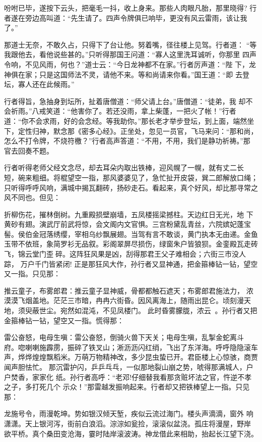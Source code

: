 吩咐已毕，遂按下云头，把毫毛一抖，收上身来。那些人肉眼凡胎，那里晓得?
行者遂在旁边高叫道：“先生请了。四声令牌俱已响毕，更没有风云雷雨，该让我
了。”

那道士无奈，不敢久占，只得下了台让他。努着嘴，径往楼上见驾。行者道：
“等我跟他去，看他说些甚的。”只听得那国王问道：“寡人这里洗耳诚听，你那里
四声令响，不见风雨，何也？”道士云：“今日龙神都不在家。”行者厉声道：“陛
下，龙神俱在家；只是这国师法不灵，请他不来。等和尚请来你看。”国王道：“即
去登坛，寡人还在此候雨。”

行者得旨，急抽身到坛所，扯着唐僧道：“师父请上台。”唐僧道：“徒弟，我
却不会祈雨。”八戒笑道：“他害你了。若还没雨，拿上柴蓬，一把火了帐！”行者
道：“你不会求雨，好的会念经。等我助你。”那长老才举步登坛，到上面，端然坐
下，定性归神，默念那《密多心经》。正坐处，忽见一员官，飞马来问：“那和尚，
怎么不打令牌，不烧符檄？”行者高声答道：“不用，不用，我们是静功祈祷。”那
官去回奏不题。

行者听得老师父经文念尽，却去耳朵内取出铁棒，迎风幌了一幌，就有丈二长
短，碗来粗细。将棍望空一指，那风婆婆见了，急忙扯开皮袋，巽二郎解放口绳；
只听得呼呼风响，满城中揭瓦翻砖，扬砂走石。看起来，真个好风，却比那寻常之
风不同也。但见：

折柳伤花，摧林倒树。九重殿损壁崩墙，五凤楼摇梁撼柱。天边红日无光，地
下黄砂有翅。演武厅前武将惊，会文阁内文官惧。三宫粉黛乱青丝，六院嫔妃蓬宝
髻。侯伯金冠落绣缨，宰相乌纱飘展翅。当驾有言不敢谈，黄门执本无由递。金鱼
玉带不依班，象简罗衫无品叙。彩阁翠屏尽损伤，绿窗朱户皆狼狈。金銮殿瓦走砖
飞，锦云堂门歪碎。这阵狂风果是凶，刮得那君王父子难相会；六街三市没人踪，
万户千门皆紧闭!
正是那狂风大作，孙行者又显神通，把金箍棒钻一钻，望空又一指。只见那：

推云童子，布雾郎君：推云童子显神威，骨都都触石遮天；布雾郎君施法力，
浓漠漠飞烟盖地。茫茫三市暗，冉冉六街昏。因风离海上，随雨出昆仑。顷刻漫天
地，须臾蔽世尘。宛然如混沌，不见凤楼门。
此时昏雾朦胧，浓云。孙行者又把金箍棒钻一钻，望空又一指。慌得那：

雷公奋怒，电母生嗔：雷公奋怒，倒骑火兽下天关；电母生嗔，乱掣金蛇离斗
府。唿喇喇施霹雳，振碎了铁叉山；淅沥沥闪红绡，飞出了东洋海。呼呼隐隐滚车
声，烨烨煌煌飘稻米。万萌万物精神改，多少昆虫蛰已开。君臣楼上心惊骇，商贾
闻声胆怯忙。
那沉雷护闪，乒乒乓乓，一似那地裂山崩之势，唬得那满城人，户户焚香，家家化
纸。孙行者高呼：“老邓!仔细替我看那贪赃坏法之官，忤逆不孝之子，多打死几个
示众！”那雷越发振响起来。行者却又把铁棒望上一指。只见那：

龙施号令，雨漫乾坤。势如银汉倾天堑，疾似云流过海门。楼头声滴滴，窗外
响潇潇。天上银河泻，街前白浪滔。淙淙如瓮捡，滚滚似盆浇。孤庄将漫屋，野岸
欲平桥。真个桑田变沧海，霎时陆岸滚波涛。神龙借此来相助，抬起长江望下浇。

